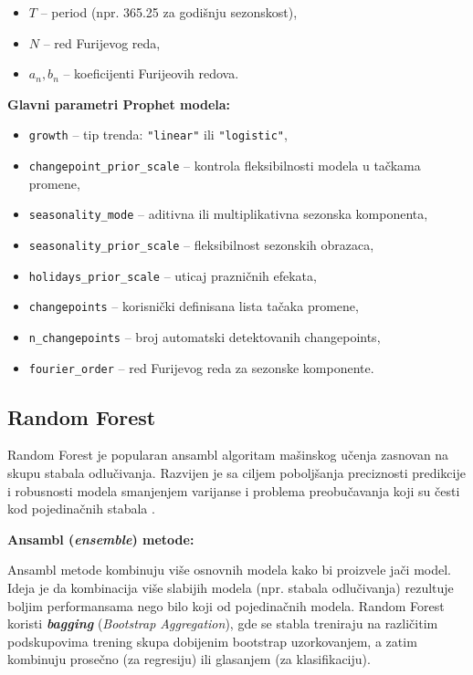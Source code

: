 \documentclass[12pt]{article}
\begin{document}
\begin{itemize}
    \item $T$ -- period (npr. 365.25 za godišnju sezonskost),
    \item $N$ -- red Furijevog reda,
    \item $a_n, b_n$ -- koeficijenti Furijeovih redova.
\end{itemize}

\textbf{Glavni parametri Prophet modela:}

\begin{itemize}
    \item \texttt{growth} -- tip trenda: \texttt{"linear"} ili \texttt{"logistic"},
    \item \texttt{changepoint\_prior\_scale} -- kontrola fleksibilnosti modela u tačkama promene,
    \item \texttt{seasonality\_mode} -- aditivna ili multiplikativna sezonska komponenta,
    \item \texttt{seasonality\_prior\_scale} -- fleksibilnost sezonskih obrazaca,
    \item \texttt{holidays\_prior\_scale} -- uticaj prazničnih efekata,
    \item \texttt{changepoints} -- korisnički definisana lista tačaka promene,
    \item \texttt{n\_changepoints} -- broj automatski detektovanih changepoints,
    \item \texttt{fourier\_order} -- red Furijevog reda za sezonske komponente.
\end{itemize}



\subsection{Random Forest}

Random Forest je popularan ansambl algoritam mašinskog učenja zasnovan na skupu stabala odlučivanja. Razvijen je sa ciljem poboljšanja preciznosti predikcije i robusnosti modela smanjenjem varijanse i problema preobučavanja koji su česti kod pojedinačnih stabala \cite{breiman2001}.

\textbf{Ansambl (\textit{ensemble}) metode:}

Ansambl metode kombinuju više osnovnih modela kako bi proizvele jači model. Ideja je da kombinacija više slabijih modela (npr. stabala odlučivanja) rezultuje boljim performansama nego bilo koji od pojedinačnih modela. Random Forest koristi \textbf{\textit{bagging}} (\textit{Bootstrap Aggregation}), gde se stabla treniraju na različitim podskupovima trening skupa dobijenim bootstrap uzorkovanjem, a zatim kombinuju prosečno (za regresiju) ili glasanjem (za klasifikaciju).
\end{document}

